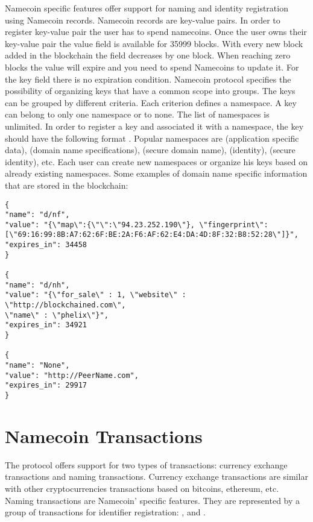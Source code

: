 Namecoin specific features offer support for naming and identity registration using Namecoin records.
Namecoin records are key-value pairs. In order to register key-value pair the user has to spend namecoins. Once the user owns their key-value pair the value field is available for 35999 blocks. With every new block added in the blockchain the  field decreases by one block. When reaching zero blocks the value will expire and you need to spend Namecoins to update it. For the key field there is no expiration condition.
Namecoin protocol specifies the possibility of organizing keys that have a common scope into groups.
The keys can be grouped by different criteria. Each criterion defines a namespace.
A key can belong to only one namespace or to none. The list of namespaces is unlimited. In order to register a key and associated it with a namespace, the key should have the following format .
Popular namespaces are  (application specific data),  (domain name specifications),  (secure domain name),  (identity),  (secure identity), etc.
Each user can create new namespaces or organize his keys based on already existing namespaces.
Some examples of domain name specific information that are stored in the blockchain:
\begin{lstlisting}
{
"name": "d/nf",
"value": "{\"map\":{\"\":\"94.23.252.190\"}, \"fingerprint\": 
[\"69:16:99:8B:A7:62:6F:BE:2A:F6:AF:62:E4:DA:4D:8F:32:B8:52:28\"]}",
"expires_in": 34458
}

{
"name": "d/nh",
"value": "{\"for_sale\" : 1, \"website\" : \"http://blockchained.com\",
\"name\" : \"phelix\"}",
"expires_in": 34921
}

{
"name": "None",
"value": "http://PeerName.com",
"expires_in": 29917
}

\end{lstlisting}


\section{Namecoin Transactions}
\label{nmc-trans-lbl}
The protocol offers support for two types of transactions: currency exchange transactions and naming transactions.
Currency exchange transactions are similar with other cryptocurrencies transactions based on bitcoins, ethereum, etc.
Naming transactions are Namecoin' specific features. They are represented by a group of transactions for identifier registration: ,  and .

